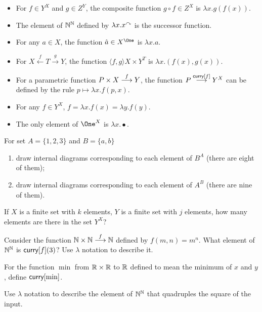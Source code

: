\begin{example}
	\begin{itemize}
	\item For $f\in Y^X$ and $g\in Z^Y$, the composite function $g\circ f\in Z^X$ is $\lambda x.g(f(x))$.
	
	\item The element of $\NN^\NN$ defined by $\lambda x.x^\nxt$ is the successor function.
	
	\item For any $a\in X$, the function $\hat a \in X^\One$ is $\lambda x.a$.
	
	\item For $X\stackrel{f}{\longleftarrow}T\stackrel{g}{\longrightarrow}Y$, the function
	${\langle f,g\rangle}{X\times Y}^T$ is $\lambda x.(f(x),g(x))$.
	
	\item For a parametric function $\sfromto f{P\times X}Y$, the function $\sfromto {\curry[f]}{P}{Y^X}$ can be defined by the rule $p\mapsto \lambda x.f(p,x)$.
	
	\item For any $f\in Y^X$, $f = \lambda x.f(x) = \lambda y.f(y)$. 

	\item The only element of $\One^X$ is $\lambda x.\bullet$.
	\end{itemize}
\end{example}
 
\begin{exercises}
	\begin{nextexercise}
		\item  For set $A= \{1,2,3\}$ and $B = \{a,b\}$ 
			\begin{enumerate}
				\item draw internal diagrams corresponding to each element of $B^A$ (there are eight of them);
				\item draw internal diagrams corresponding to each element of $A^B$ (there are nine of them).
			\end{enumerate}
		\item If $X$ is a finite set with $k$ elements, $Y$ is a finite set with $j$ elements, how many elements are there in the set $Y^X$? 
		\item Consider the function $\sfromto f{\NN\times\NN}\NN$ defined by
		      $f(m,n) = m^n$. What element of $\NN^\NN$ is $\curry[f](3)$? Use $\lambda$ notation to describe it.
		\item For the function $\min$ from $\RR\times\RR$ to $\RR$ defined to mean the minimum of $x$ and $y$, define $\curry[\min]$.
		\item Use $\lambda$ notation to describe the element of $\NN^\NN$ that quadruples the square of the input.
	\end{nextexercise}	
\end{exercises}

